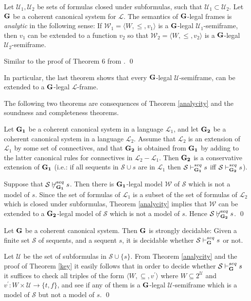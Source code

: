 \documentclass{LMCS}
\theoremstyle{remark}
\newcommand{\lp}{\mathcal{L}}
\newcommand{\Ss}{\mathcal{S}}
\newcommand{\U}{\mathcal{U}}
\newcommand{\G}{{\bf G}}
\newcommand{\W}{\mathcal{W}}
\newcommand{\vd}{\vdash}
\newcommand{\tup}[1]{\langle #1 \rangle}
\newcommand{\suq}{\subseteq}
\begin{document}
\begin{enumerate}[(a)]
\begin{enumerate}[\bf(a):]
\begin{thm}[Analycity]
\label{analycity}
Let $\U_1,\U_2$ be sets of formulas closed under subformulas, 
such that $\U_1\subset\U_2$.
Let ${\G}$ be a coherent canonical system for $\lp$.
The semantics of ${\G}$-legal frames is {\em analytic}
in the following sense: 
If ${\W_1=\tup{W,\leq,v_1}}$ is a ${\G}$-legal $\U_1$-semiframe, 
then $v_1$ can be extended to a function $v_2$ so that 
${\W_2=\tup{W, \leq,v_2}}$ is a ${\G}$-legal $\U_2$-semiframe.
\end{thm}
\proof
Similar to the proof of Theorem 6 from \cite{AL10}.
\qed


\begin{rem}
In particular, the last theorem shows that 
every ${\G}$-legal $\U$-semiframe, 
can be extended to a ${\G}$-legal $\lp$-frame.
\end{rem}

The following two theorems are consequences 
of Theorem \ref{analycity} and the
soundness and completeness theorems.

\begin{thm}[Conservativity]
\label{conservativity}
Let ${\bf G_1}$ be a coherent canonical system
in a language $\lp_1$, and let ${\bf G_2}$ be a 
coherent canonical  system in a language $\lp_2$.
Assume that $\lp_2$ is an extension of $\lp_1$
by some set of connectives, and that ${\bf G_2}$
is obtained from ${\bf G_1}$ by adding to the latter
canonical rules for connectives in $\lp_2-\lp_1$.
Then ${\bf G_2}$ is a conservative extension of ${\bf G_1}$
(i.e.: if all sequents in $\Ss\cup s$
are in $\lp_1$ then $\Ss\vd_{\bf G_1}^{seq} s$
iff $\Ss\vd_{\bf G_2}^{seq} s$).
\end{thm}
\proof
Suppose that ${\Ss}\not\vd_{\bf G_1}^{seq} s$. 
Then there is ${\bf G_1}$-legal model $\W$ of $\Ss$ which is not a model of $s$. 
Since the set of formulas of $\lp_1$ is a subset of the set of formulas of $\lp_2$ which is
closed under subformulas, 
Theorem \ref{analycity} implies that $\W$ can be extended to a ${\bf G_2}$-legal model 
of $\Ss$ which is not a model of $s$.
Hence ${\Ss}\not\vd_{\bf G_2}^{seq} s$.
\qed

\begin{thm}[Decidability]
\label{decidability} 
Let ${\G}$ be a coherent canonical system. 
Then ${\G}$ is strongly decidable:
Given a finite set $\Ss$ of sequents, and a sequent $s$,
it is decidable whether $\Ss\vd_{{\G}}^{seq}s$ or not.
\end{thm}
\proof
Let ${\U}$ be the set of subformulas in
$\Ss\cup\{s\}$. From Theorem \ref{analycity} and the proof
of Theorem \ref{key} it easily follows that
in order to decide whether ${\Ss\vd_{{\G}}^{seq}s}$
it suffices to check all triples of the form $\tup{W,\suq,v^\prime}$
where $W\suq 2^\U$ and 
${v^\prime: W \times \U  \to \{t,f\}}$,
and see if any of them is a ${\G}$-legal $\U$-semiframe
which is a model of $\Ss$ but not a model of $s$.
\qed


\end{enumerate}
\end{enumerate}
\end{document}
